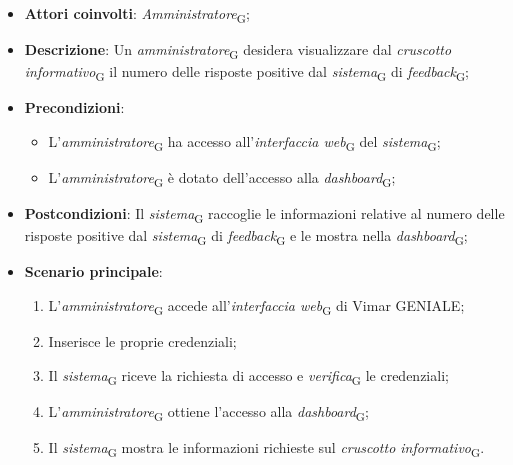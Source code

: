\begin{itemize}
    \item \textbf{Attori coinvolti}: \textit{Amministratore}\textsubscript{G};
    \item \textbf{Descrizione}: Un \textit{amministratore}\textsubscript{G} desidera visualizzare dal \textit{cruscotto informativo}\textsubscript{G} il numero delle risposte positive dal \textit{sistema}\textsubscript{G} di \textit{feedback}\textsubscript{G};
    \item \textbf{Precondizioni}: 
        \begin{itemize}
            \item L’\textit{amministratore}\textsubscript{G} ha accesso all’\textit{interfaccia web}\textsubscript{G} del \textit{sistema}\textsubscript{G};
            \item L’\textit{amministratore}\textsubscript{G} è dotato dell’accesso alla \textit{dashboard}\textsubscript{G};
        \end{itemize}
    \item \textbf{Postcondizioni}: Il \textit{sistema}\textsubscript{G} raccoglie le informazioni relative al numero delle risposte positive dal \textit{sistema}\textsubscript{G} di \textit{feedback}\textsubscript{G} e le mostra nella \textit{dashboard}\textsubscript{G};
    \item \textbf{Scenario principale}:
    \begin{enumerate}
    \item L’\textit{amministratore}\textsubscript{G} accede all’\textit{interfaccia web}\textsubscript{G} di Vimar GENIALE;
    \item Inserisce le proprie credenziali;
    \item Il \textit{sistema}\textsubscript{G} riceve la richiesta di accesso e \textit{verifica}\textsubscript{G} le credenziali;
    \item L’\textit{amministratore}\textsubscript{G} ottiene l’accesso alla \textit{dashboard}\textsubscript{G};
    \item Il \textit{sistema}\textsubscript{G} mostra le informazioni richieste sul \textit{cruscotto informativo}\textsubscript{G}.
    \end{enumerate}
\end{itemize}

